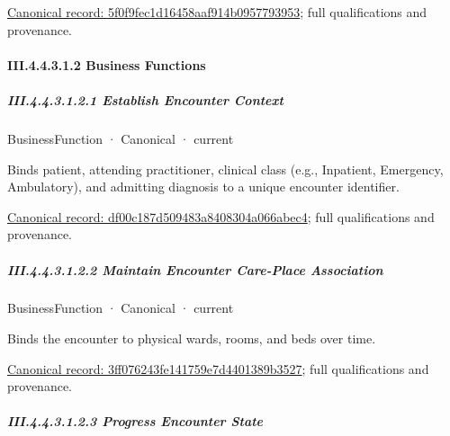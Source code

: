{\footnotesize \href{../../../../../../../../continuum/business/business-service/5f0f9fec1d16458aaf914b0957793953.md}{Canonical record: 5f0f9fec1d16458aaf914b0957793953}; full qualifications and provenance.}\par
\paragraph*{III.4.4.3.1.2 Business Functions}
\label{navigation:III.4.4.3.1.2}

\subparagraph*{III.4.4.3.1.2.1 Establish Encounter Context}
\label{navigation:III.4.4.3.1.2.1}

\label{element:df00c187d509483a8408304a066abec4}
{\small BusinessFunction · Canonical · current}\par

Binds patient, attending practitioner, clinical class (e.g., Inpatient, Emergency, Ambulatory), and admitting diagnosis to a unique encounter identifier.


{\footnotesize \href{../../../../../../../../continuum/business/business-function/df00c187d509483a8408304a066abec4.md}{Canonical record: df00c187d509483a8408304a066abec4}; full qualifications and provenance.}\par
\subparagraph*{III.4.4.3.1.2.2 Maintain Encounter Care-Place Association}
\label{navigation:III.4.4.3.1.2.2}

\label{element:3ff076243fe141759e7d4401389b3527}
{\small BusinessFunction · Canonical · current}\par

Binds the encounter to physical wards, rooms, and beds over time.


{\footnotesize \href{../../../../../../../../continuum/business/business-function/3ff076243fe141759e7d4401389b3527.md}{Canonical record: 3ff076243fe141759e7d4401389b3527}; full qualifications and provenance.}\par
\subparagraph*{III.4.4.3.1.2.3 Progress Encounter State}
\label{navigation:III.4.4.3.1.2.3}

